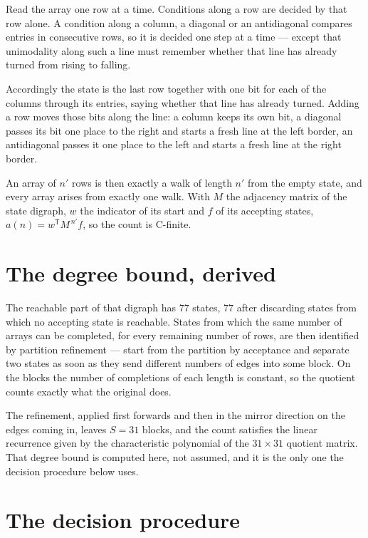 \documentclass[11pt]{article}
\theoremstyle{definition}
\begin{document}
Read the array one row at a time. Conditions along a row are decided by that row alone. A condition along a column, a diagonal or an antidiagonal compares entries in consecutive rows, so it is decided one step at a time --- except that unimodality along such a line must remember whether that line has already turned from rising to falling.

Accordingly the state is the last row together with one bit for each of the columns through its entries, saying whether that line has already turned. Adding a row moves those bits along the line: a column keeps its own bit, a diagonal passes its bit one place to the right and starts a fresh line at the left border, an antidiagonal passes it one place to the left and starts a fresh line at the right border.

An array of $n'$ rows is then exactly a walk of length $n'$ from the empty state, and every array arises from exactly one walk. With $M$ the adjacency matrix of the state digraph, $w$ the indicator of its start and $f$ of its accepting states, $a(n) = w^{\mathsf T}M^{\,n'}f$, so the count is C-finite.

\section{The degree bound, derived}

The reachable part of that digraph has $77$ states, $77$ after discarding states from which no accepting state is reachable. States from which the same number of arrays can be completed, for every remaining number of rows, are then identified by partition refinement --- start from the partition by acceptance and separate two states as soon as they send different numbers of edges into some block. On the blocks the number of completions of each length is constant, so the quotient counts exactly what the original does.

The refinement, applied first forwards and then in the mirror direction on the edges coming in, leaves $S = 31$ blocks, and the count satisfies the linear recurrence given by the characteristic polynomial of the $31 \times 31$ quotient matrix. That degree bound is computed here, not assumed, and it is the only one the decision procedure below uses.

\section{The decision procedure}
\end{document}
